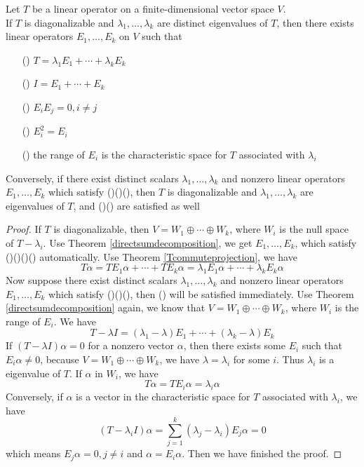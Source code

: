 \documentclass{article}
\begin{document}
\begin{thm}\label{EigenvalueDecomposition}
	Let $T$ be a linear operator on a finite-dimensional vector space $V$.\\
	If $T$ is diagonalizable and $\lambda_1,\dots,\lambda_k$ are distinct eigenvalues of $T$, then there exists linear operators $E_1,\dots,E_k$ on $V$ such that 
	\begin{enumerate}
		\item [(\romannumeral1)]$T=\lambda_1E_1+\cdots+\lambda_kE_k$
		\item [(\romannumeral2)]$I=E_1+\cdots+E_k$
		\item [(\romannumeral3)]$E_iE_j=0,i\neq j$
		\item [(\romannumeral4)]$E_i^2=E_i$
		\item [(\romannumeral5)]the range of $E_i$ is the characteristic space for $T$ associated with $\lambda_i$
	\end{enumerate}
	Conversely, if there exist distinct scalars $\lambda_1,\dots,\lambda_k$ and nonzero linear operators $E_1,\dots,E_k$ which satisfy ()()(), then $T$ is diagonalizable and $\lambda_1,\dots,\lambda_k$ are eigenvalues of $T$, and ()() are satisfied as well
\end{thm}
\begin{proof}
	If $T$ is diagonalizable, then $V=W_1\oplus\cdots\oplus W_k$, where $W_i$ is the null space of $T-\lambda_i$. Use Theorem \ref{directsumdecomposition}, we get $E_1,\dots,E_k$, which satisfy ()()()() automatically. Use Theorem \ref{Tcommuteprojection}, we have
	\[T\alpha=TE_1\alpha+\cdots+TE_k\alpha=\lambda_1E_1\alpha+\cdots+\lambda_kE_k\alpha\]
	Now suppose there exist distinct scalars $\lambda_1,\dots,\lambda_k$ and nonzero linear operators $E_1,\dots,E_k$ which satisfy ()()(), then () will be satisfied immediately. Use Theorem \ref{directsumdecomposition} again, we know that $V=W_1\oplus\cdots\oplus W_k$, where $W_i$ is the range of $E_i$. We have
	\[T-\lambda I=(\lambda_1-\lambda)E_1+\cdots+(\lambda_k-\lambda)E_k\]
	If $(T-\lambda I)\alpha=0$ for a nonzero vector $\alpha$, then there exists some $E_i$ such that $E_i\alpha\neq0$, because $V=W_1\oplus\cdots\oplus W_k$, we have $\lambda=\lambda_i$ for some $i$. Thus $\lambda_i$ is a eigenvalue of $T$. If $\alpha$ in $W_i$, we have
	\[T\alpha=TE_i\alpha=\lambda_i\alpha\]
	Conversely, if $\alpha$ is a vector in the characteristic space for $T$ associated with $\lambda_i$, we have
	\[(T-\lambda_i I)\alpha=\sum\limits_{j=1}^k(\lambda_j-\lambda_i)E_j\alpha=0\]
	which means $E_j\alpha=0,j\neq i$ and $\alpha=E_i\alpha$.
	Then we have finished the proof.  
\end{proof}
\end{document}
